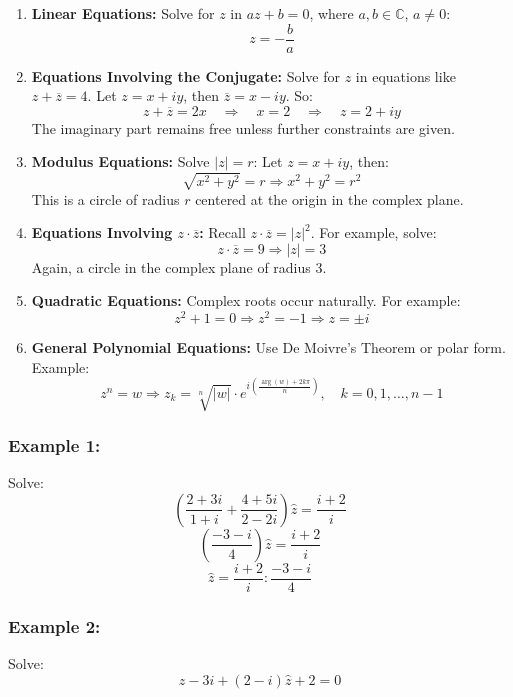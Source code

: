 \begin{enumerate}
	\item \textbf{Linear Equations:}
	      Solve for \( z \) in \( az + b = 0 \), where \( a, b \in \mathbb{C} \), \( a \neq 0 \):
	      \[
		      z = -\frac{b}{a}
	      \]

	\item \textbf{Equations Involving the Conjugate:}
	      Solve for \( z \) in equations like \( z + \overline{z} = 4 \).
	      Let \( z = x + iy \), then \( \overline{z} = x - iy \). So:
	      \[
		      z + \overline{z} = 2x \quad \Rightarrow \quad x = 2 \quad \Rightarrow \quad z = 2 + iy
	      \]
	      The imaginary part remains free unless further constraints are given.

	\item \textbf{Modulus Equations:}
	      Solve \( |z| = r \):
	      Let \( z = x + iy \), then:
	      \[
		      \sqrt{x^2 + y^2} = r \Rightarrow x^2 + y^2 = r^2
	      \]
	      This is a circle of radius \( r \) centered at the origin in the complex plane.

	\item \textbf{Equations Involving \( z \cdot \overline{z} \):}
	      Recall \( z \cdot \overline{z} = |z|^2 \).
	      For example, solve:
	      \[
		      z \cdot \overline{z} = 9 \Rightarrow |z| = 3
	      \]
	      Again, a circle in the complex plane of radius 3.

	\item \textbf{Quadratic Equations:}
	      Complex roots occur naturally. For example:
	      \[
		      z^2 + 1 = 0 \Rightarrow z^2 = -1 \Rightarrow z = \pm i
	      \]

	\item \textbf{General Polynomial Equations:}
	      Use De Moivre’s Theorem or polar form. Example:
	      \[
		      z^n = w \Rightarrow z_k = \sqrt[n]{|w|} \cdot e^{i\left( \frac{\arg(w) + 2k\pi}{n} \right)}, \quad k = 0, 1, \dots, n-1
	      \]
\end{enumerate}

\subsubsection{Example 1:}
Solve:
\[
	\left( \frac{2 + 3i}{1 + i} + \frac{4 + 5i}{2 - 2i}\right) \hat{z} = \frac{i + 2}{i}
\]
\[
	\left( \frac{-3 -i}{4} \right) \hat{z} = \frac{i + 2}{i}
\]
\[
	\hat{z} = \frac{i + 2}{i} : \frac{-3 -i}{4}
\]

\subsubsection{Example 2:}
Solve:
\[
	z - 3i + (2 -i)\hat{z} + 2 = 0
\]

